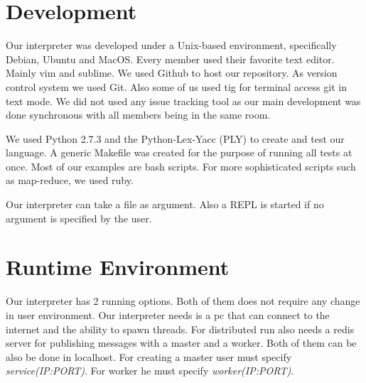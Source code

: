 \section{Development}
Our interpreter was developed under a Unix-based environment, specifically Debian, Ubuntu and MacOS.
Every member used their favorite text editor. Mainly vim and sublime. We used Github to host our
repository. As version control system we used Git. Also some of us used tig for terminal access git in
text mode. We did not used any issue tracking tool as 
our main development was done synchronous with all members being in the same room.

We used Python 2.7.3 and the Python-Lex-Yacc (PLY) to create and test our language. A generic Makefile
was created for the purpose of running all tests at once. Most of our examples are bash scripts.
For more sophisticated scripts such as map-reduce, we used ruby.

Our interpreter can take a file as argument. Also a REPL is started if no argument
is specified by the user.

\section{Runtime Environment}
Our interpreter has 2 running options. Both of them does not require any change in user environment.
Our interpreter needs is a pc that can connect to the internet and the ability to spawn threads. For 
distributed run also needs a redis server for publishing messages with a master and a worker. Both of them can be also 
be done in localhost.
For creating a master user must specify \textit{service(IP:PORT)}. For worker he must
specify \textit{worker(IP:PORT)}.

